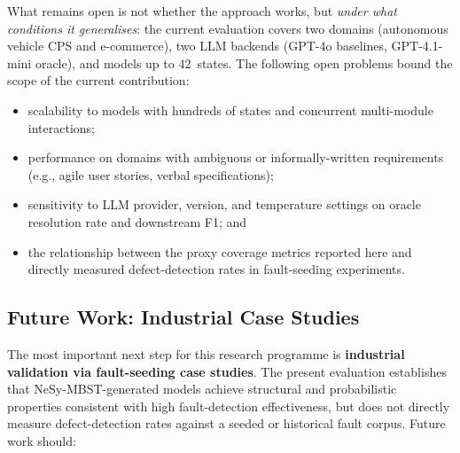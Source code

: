 What remains open is not whether the approach works, but
\emph{under what conditions it generalises}: the current evaluation
covers two domains (autonomous vehicle CPS and e-commerce), two
LLM backends (GPT-4o baselines, GPT-4.1-mini oracle), and models
up to 42~states.  The following open problems bound the scope of
the current contribution:
\begin{itemize}
    \item scalability to models with hundreds of states and
    concurrent multi-module interactions;
    \item performance on domains with ambiguous or informally-written
    requirements (e.g., agile user stories, verbal specifications);
    \item sensitivity to LLM provider, version, and temperature
    settings on oracle resolution rate and downstream F1; and
    \item the relationship between the proxy coverage metrics reported
    here and directly measured defect-detection rates in
    fault-seeding experiments.
\end{itemize}

\subsection{Future Work: Industrial Case Studies}
\label{subsec:future_work}

The most important next step for this research programme is
\textbf{industrial validation via fault-seeding case studies}.
The present evaluation establishes that NeSy-MBST-generated models
achieve structural and probabilistic properties consistent with
high fault-detection effectiveness, but does not directly measure
defect-detection rates against a seeded or historical fault corpus.
Future work should:


